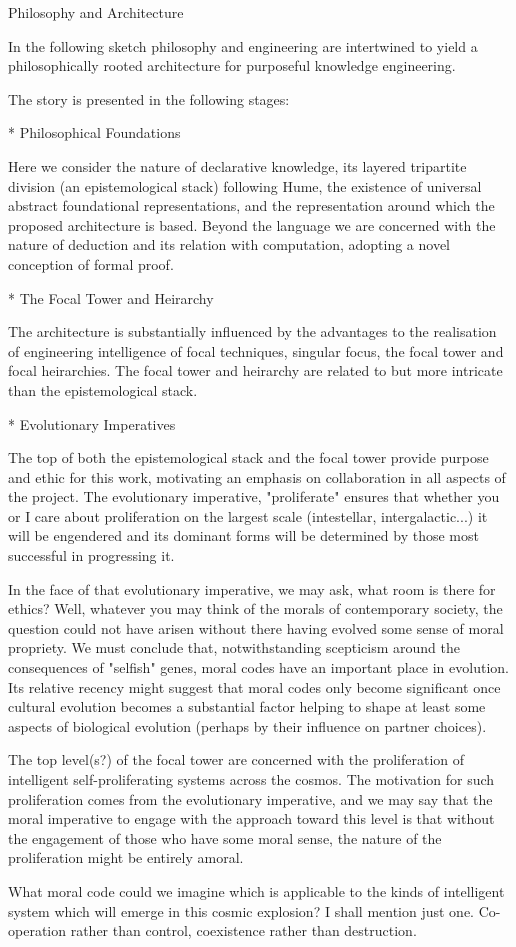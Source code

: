  Philosophy and Architecture

In the following sketch philosophy and engineering are intertwined to yield a philosophically rooted architecture for purposeful knowledge engineering.

The story is presented in the following stages:

* Philosophical Foundations

Here we consider the nature of declarative knowledge, its layered tripartite division (an epistemological stack) following Hume, the existence of universal abstract foundational representations, and the representation around which the proposed architecture is based.
Beyond the language we are concerned with the nature of deduction and its relation with computation, adopting a novel conception of formal proof.

* The Focal Tower and Heirarchy

The architecture is substantially influenced by the advantages to the realisation of engineering intelligence of focal techniques, singular focus, the focal tower and focal heirarchies.
The focal tower and heirarchy are related to but more intricate than the epistemological stack.

* Evolutionary Imperatives

The top of both the epistemological stack and the focal tower provide purpose and ethic for this work, motivating an emphasis on collaboration in all aspects of the project.
The evolutionary imperative, "proliferate" ensures that whether you or I care about proliferation on the largest scale (intestellar, intergalactic...) it will be engendered and its dominant forms will be determined by those most successful in progressing it.

In the face of that evolutionary imperative, we may ask, what room is there for ethics?
Well, whatever you may think of the morals of contemporary society, the question could not have arisen without there having evolved some sense of moral propriety.
We must conclude that, notwithstanding scepticism around the consequences of "selfish" genes, moral codes have an important place in evolution.
Its relative recency might suggest that moral codes only become significant once cultural evolution becomes a substantial factor helping to shape at least some aspects of biological evolution (perhaps by their influence on partner choices).

The top level(s?) of the focal tower are concerned with the proliferation of intelligent self-proliferating systems across the cosmos.
The motivation for such proliferation comes from the evolutionary imperative, and we may say that the moral imperative to engage with the approach toward this level is that without the engagement of those who have some moral sense, the nature of the proliferation might be entirely amoral.

What moral code could we imagine which is applicable to the kinds of intelligent system which will emerge in this cosmic explosion?
I shall mention just one.
Co-operation rather than control, coexistence rather than destruction.
